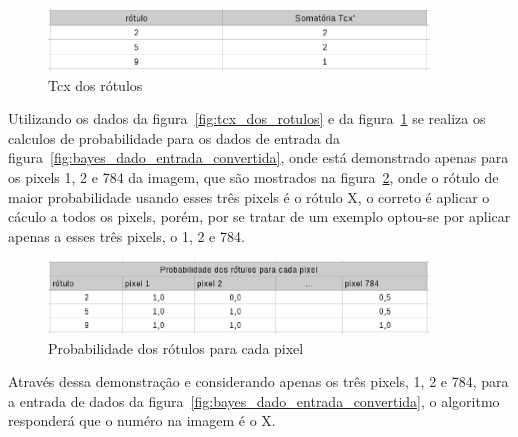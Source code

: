 \begin{figure}[h]
  \centering
  \includegraphics[width=0.9\textwidth]{figuras/somatoria_tcx_dos_rotulos.eps}
  \caption{Tcx dos rótulos}
  \label{fig:somatoria_tcx_dos_rotulos}
\end{figure}

Utilizando os dados da figura~\ref{fig:tcx_dos_rotulos} e da figura~\ref{fig:somatoria_tcx_dos_rotulos}
se realiza os calculos de probabilidade para os dados de entrada da
figura~\ref{fig:bayes_dado_entrada_convertida}, onde está demonstrado apenas para
os pixels 1, 2 e 784 da imagem, que são mostrados na figura~\ref{fig:probabilidades_dos_rotulos},
onde o rótulo de maior probabilidade usando esses três pixels é o rótulo X, o
correto é aplicar o cáculo a todos os pixels, porém, por se tratar de um exemplo
optou-se por aplicar apenas a esses três pixels, o 1, 2 e 784.

\begin{figure}[h]
  \centering
  \includegraphics[width=0.9\textwidth]{figuras/probabilidades_dos_rotulos.eps}
  \caption{Probabilidade dos rótulos para cada pixel}
  \label{fig:probabilidades_dos_rotulos}
\end{figure}

Através dessa demonstração e considerando apenas os três pixels, 1, 2 e 784,
para a entrada de dados da figura~\ref{fig:bayes_dado_entrada_convertida}, o
algoritmo responderá que o numéro na imagem é o X.
